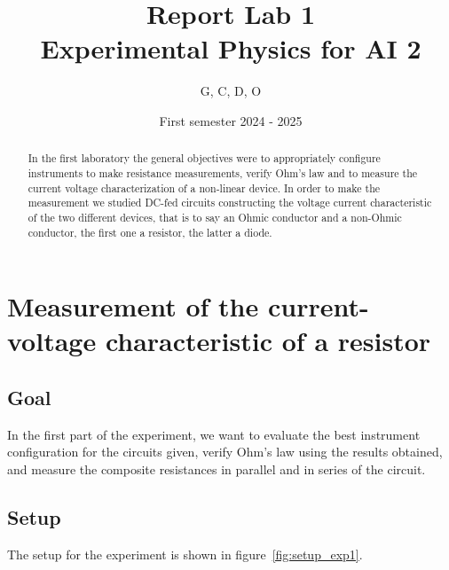 \documentclass[notitlepage]{report}
\title{Report Lab 1\\\small Experimental Physics for AI 2}
\author{G, C, D, O}
\date{First semester 2024 \-- 2025}
\numberwithin{equation}{section}
\theoremstyle{plain}
\theoremstyle{definition}
\theoremstyle{remark}
\begin{document}
\maketitle

\begin{abstract}

In the first laboratory the general objectives were to appropriately configure
instruments to make resistance measurements, verify Ohm’s law and to measure
the current voltage characterization of a non-linear device. In order to make
the measurement we studied DC-fed circuits constructing the voltage current
characteristic of the two different devices, that is to say an Ohmic conductor
and a non-Ohmic conductor, the first one a resistor, the latter a diode.
    
\end{abstract}


\chapter{Measurement of the current-voltage characteristic of a resistor}
\section{Goal}
In the first part of the experiment, we want to evaluate the best instrument
configuration for the circuits given, verify Ohm’s law using the results
obtained, and measure the composite resistances in parallel and in series of the
circuit.

\section{Setup}

The setup for the experiment is shown in
figure~\ref{fig:setup_exp1}.
\end{document}
